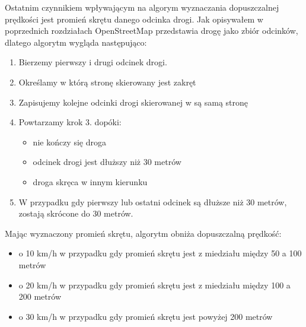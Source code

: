 Ostatnim czynnikiem wpływającym na algorym wyznaczania dopuszczalnej prędkości jest promień skrętu danego odcinka drogi. Jak opisywałem w poprzednich rozdziałach OpenStreetMap przedstawia drogę jako zbiór odcinków, dlatego algorytm wygląda następująco:
\begin{enumerate}
\item Bierzemy pierwszy i drugi odcinek drogi.
\item Określamy w którą stronę skierowany jest zakręt
\item Zapisujemy kolejne odcinki drogi skierowanej w są samą stronę
\item Powtarzamy krok 3. dopóki:
\begin{itemize}
\item nie kończy się droga
\item odcinek drogi jest dłuższy niż 30 metrów
\item droga skręca w innym kierunku
\end{itemize} 
\item W przypadku gdy pierwszy lub ostatni odcinek są dłuższe niż 30 metrów, zostają skrócone do 30 metrów.
\end{enumerate}

Mając wyznaczony promień skrętu, algorytm obniża dopuszczalną prędkość:
\begin{itemize}
\item o 10 km/h w przypadku gdy promień skrętu jest z miedziału między 50 a 100 metrów
\item o 20 km/h w przypadku gdy promień skrętu jest z miedziału między 100 a 200 metrów
\item o 30 km/h w przypadku gdy promień skrętu jest powyżej 200 metrów
\end{itemize}


